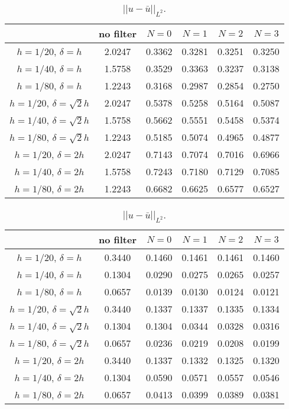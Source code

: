 \begin{table}[h!]
\caption{$|| u - \bar{u}||_{L^2}$.}
\begin{center}
\begin{tabular}{|c|c|c|c|c|c|}
\hline
&	no filter	&	$N=0$	&	$N=1$	&	$N=2$	&	$N=3$\\
\hline
$h=1/20$, $\delta=h$&	2.0247&	0.3362&	0.3281&	0.3251&	0.3250\\
\hline
$h=1/40$, $\delta=h$&	1.5758&	0.3529&	0.3363&	0.3237&	0.3138\\
\hline
$h=1/80$, $\delta=h$&	1.2243&	0.3168&	0.2987&	0.2854&	0.2750\\
\hline
$h=1/20$, $\delta=\sqrt{2}h$&	2.0247&	0.5378&	0.5258&	0.5164&	0.5087\\
\hline
$h=1/40$, $\delta=\sqrt{2}h$&	1.5758&	0.5662&	0.5551&	0.5458&	0.5374\\
\hline
$h=1/80$, $\delta=\sqrt{2}h$&	1.2243&	0.5185&	0.5074&	0.4965&	0.4877\\
\hline
$h=1/20$, $\delta=2h$&	2.0247&	0.7143&	0.7074&	0.7016&	0.6966\\
\hline
$h=1/40$, $\delta=2h$&	1.5758&	0.7243&	0.7180&	0.7129&	0.7085\\
\hline
$h=1/80$, $\delta=2h$&	1.2243&	0.6682&	0.6625&	0.6577&	0.6527\\
\hline
\end{tabular}
\end{center}
\label{2D_cd_Linf}
\end{table}

\begin{table}[h!]
\caption{$|| u - \bar{u}||_{L^2}$.}
\begin{center}
\begin{tabular}{|c|c|c|c|c|c|}
\hline
	&	no filter	&	$N=0$	&	$N=1$	&	$N=2$	&	$N=3$\\
\hline
$h=1/20$, $\delta=h$	&	0.3440	&	0.1460	&	0.1461	&	0.1461	&	0.1460\\
\hline
$h=1/40$, $\delta=h$	&	0.1304	&	0.0290	&	0.0275	&	0.0265	&	0.0257\\
\hline
$h=1/80$, $\delta=h$	&	0.0657	&	0.0139	&	0.0130	&	0.0124	&	0.0121\\
\hline
$h=1/20$, $\delta=\sqrt{2}h$	&	0.3440	&	0.1337	&	0.1337	&	0.1335	&	0.1334\\
\hline
$h=1/40$, $\delta=\sqrt{2}h$	&	0.1304	&	0.1304	&	0.0344	&	0.0328	&	0.0316\\
\hline
$h=1/80$, $\delta=\sqrt{2}h$	&	0.0657	&	0.0236	&	0.0219	&	0.0208	&	0.0199\\
\hline
$h=1/20$, $\delta=2h$	&	0.3440	&	0.1337	&	0.1332	&	0.1325	&	0.1320\\
\hline
$h=1/40$, $\delta=2h$	&	0.1304	&	0.0590	&	0.0571	&	0.0557	&	0.0546\\
\hline
$h=1/80$, $\delta=2h$	&	0.0657	&	0.0413	&	0.0399	&	0.0389	&	0.0381\\
\hline
\end{tabular}
\end{center}
\label{2D_cd_Linf}
\end{table}
